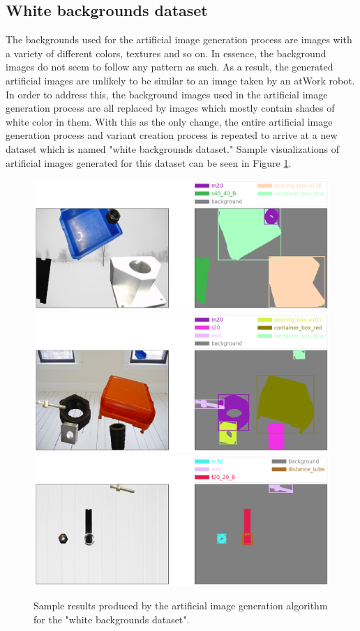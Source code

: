 	\subsection{White backgrounds dataset}
The backgrounds used for the artificial image generation process are images with a variety of different colors, textures and so on. In essence, the background images do not seem to follow any pattern as such. As a result, the generated artificial images are unlikely to be similar to an image taken by an atWork robot. In order to address this, the background images used in the artificial image generation process are all replaced by images which mostly contain shades of white color in them. With this as the only change, the entire artificial image generation process and variant creation process is repeated to arrive at a new dataset which is named "white backgrounds dataset." Sample visualizations of artificial images generated for this dataset can be seen in Figure \ref{Fig:samplewhite}.

	\begin{figure}
		\centering
		\includegraphics[scale=0.3]{images/sample_white_1}
		\includegraphics[scale=0.3]{images/sample_white_2}
		\includegraphics[scale=0.3]{images/sample_white_3}
		\caption{Sample results produced by the artificial image generation algorithm for the "white backgrounds dataset".}
		\label{Fig:samplewhite}
	\end{figure}
	
